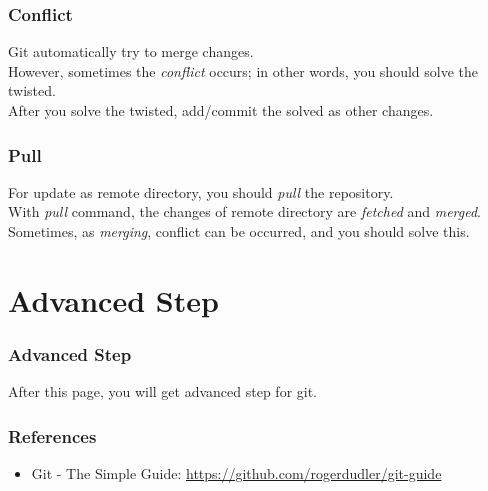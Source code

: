 \documentclass[aspectratio=169]{beamer}
\begin{document}
	\begin{frame}
		\frametitle{Conflict}
		Git automatically try to merge changes. \\
		However, sometimes the \textit{conflict} occurs; in other words, you should solve the twisted. \\
		After you solve the twisted, add/commit the solved as other changes. 
	\end{frame}

	\begin{frame}
		\frametitle{Pull}
		For update as remote directory, you should \textit{pull} the repository. \\
		With \textit{pull} command, the changes of remote directory are \textit{fetched} and \textit{merged}. \\
		Sometimes, as \textit{merging}, conflict can be occurred, and you should solve this. 
	\end{frame}

	\section{Advanced Step}
	\begin{frame}
		\frametitle{Advanced Step}
		After this page, you will get advanced step for git. 
	\end{frame}

	\begin{frame}
		\frametitle{References}
		
		\begin{itemize}
			\item Git - The Simple Guide: \url{https://github.com/rogerdudler/git-guide}
		\end{itemize}
	\end{frame}
\end{document}
